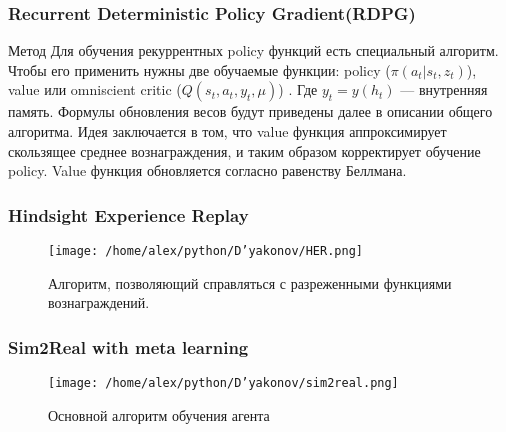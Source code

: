 \documentclass[fleqn, xcolor=x11names]{beamer}
\begin{document}
\begin{frame}\frametitle{Recurrent Deterministic Policy Gradient(RDPG)}

\begin{block}{{\footnotesize Метод}}
{\footnotesize Для обучения рекуррентных policy функций есть специальный алгоритм. Чтобы его применить нужны две обучаемые функции: policy ($\pi(a_t|s_t, z_t)$), value или omniscient critic ($Q(s_t, a_t, y_t, \mu)$) . Где $y_t = y(h_t)$ --- внутренняя память. Формулы обновления весов будут приведены далее в описании общего алгоритма. Идея заключается в том, что value функция аппроксимирует скользящее среднее вознаграждения, и таким образом корректирует обучение policy. Value функция обновляется согласно равенству Беллмана.}
\end{block}

\end{frame}

\begin{frame}\frametitle{Hindsight Experience Replay}

\begin{figure}[h]
\begin{center}
\texttt{[image: /home/alex/python/D'yakonov/HER.png]}
\caption{ Алгоритм, позволяющий справляться с разреженными функциями вознаграждений.}
\end{center}
\end{figure}

\end{frame}

\begin{frame}\frametitle{Sim2Real with meta learning}

\begin{figure}[h]
\begin{center}
\texttt{[image: /home/alex/python/D'yakonov/sim2real.png]}
\caption{ Основной алгоритм обучения агента}
\end{center}
\end{figure}

\end{frame}
\end{document}
